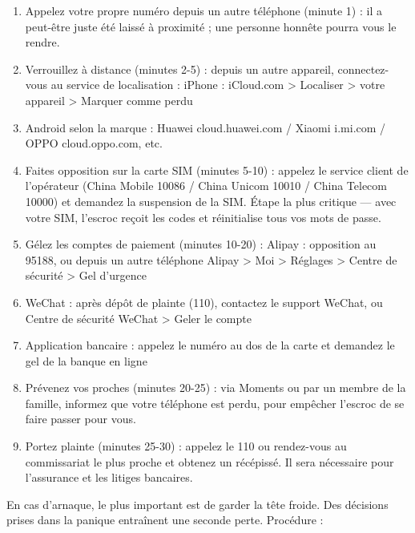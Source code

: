 \begin{enumerate}
  \item Appelez votre propre numéro depuis un autre téléphone (minute 1) : il a peut-être juste été laissé à proximité ; une personne honnête pourra vous le rendre.
  \item Verrouillez à distance (minutes 2-5) : depuis un autre appareil, connectez-vous au service de localisation : iPhone : iCloud.com > Localiser > votre appareil > Marquer comme perdu
  \item Android selon la marque : Huawei cloud.huawei.com / Xiaomi i.mi.com / OPPO cloud.oppo.com, etc.
  \item Faites opposition sur la carte SIM (minutes 5-10) : appelez le service client de l'opérateur (China Mobile 10086 / China Unicom 10010 / China Telecom 10000) et demandez la suspension de la SIM. Étape la plus critique — avec votre SIM, l'escroc reçoit les codes et réinitialise tous vos mots de passe.
  \item Gélez les comptes de paiement (minutes 10-20) : Alipay : opposition au 95188, ou depuis un autre téléphone Alipay > Moi > Réglages > Centre de sécurité > Gel d'urgence
  \item WeChat : après dépôt de plainte (110), contactez le support WeChat, ou Centre de sécurité WeChat > Geler le compte
  \item Application bancaire : appelez le numéro au dos de la carte et demandez le gel de la banque en ligne
  \item Prévenez vos proches (minutes 20-25) : via Moments ou par un membre de la famille, informez que votre téléphone est perdu, pour empêcher l'escroc de se faire passer pour vous.
  \item Portez plainte (minutes 25-30) : appelez le 110 ou rendez-vous au commissariat le plus proche et obtenez un récépissé. Il sera nécessaire pour l'assurance et les litiges bancaires.
\end{enumerate}


En cas d'arnaque, le plus important est de garder la tête froide. Des décisions prises dans la panique entraînent une seconde perte. Procédure :


